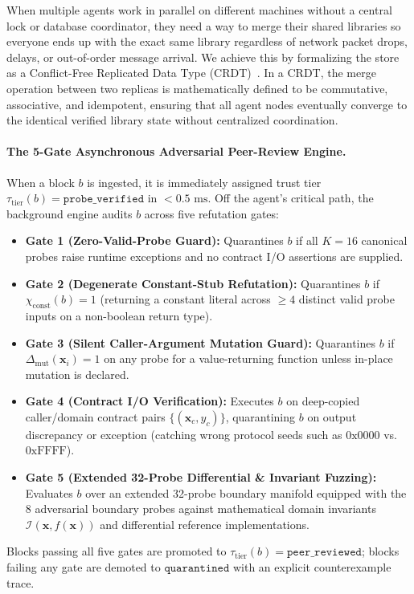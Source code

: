 \documentclass[10pt,twocolumn]{article}
\begin{document}
When multiple agents work in parallel on different machines without a central lock or database coordinator, they need a way to merge their shared libraries so everyone ends up with the exact same library regardless of network packet drops, delays, or out-of-order message arrival. We achieve this by formalizing the store as a Conflict-Free Replicated Data Type (CRDT)~\cite{shapiro2011crdt}. In a CRDT, the merge operation between two replicas is mathematically defined to be commutative, associative, and idempotent, ensuring that all agent nodes eventually converge to the identical verified library state without centralized coordination.

\paragraph{The 5-Gate Asynchronous Adversarial Peer-Review Engine.}
When a block $b$ is ingested, it is immediately assigned trust tier $\tau_{\text{tier}}(b) = \texttt{probe\_verified}$ in $<0.5\text{ ms}$. Off the agent's critical path, the background engine audits $b$ across five refutation gates:
\begin{itemize}
    \item \textbf{Gate 1 (Zero-Valid-Probe Guard):} Quarantines $b$ if all $K=16$ canonical probes raise runtime exceptions and no contract I/O assertions are supplied.
    \item \textbf{Gate 2 (Degenerate Constant-Stub Refutation):} Quarantines $b$ if $\chi_{\text{const}}(b) = 1$ (returning a constant literal across $\ge 4$ distinct valid probe inputs on a non-boolean return type).
    \item \textbf{Gate 3 (Silent Caller-Argument Mutation Guard):} Quarantines $b$ if $\Delta_{\text{mut}}(\mathbf{x}_i) = 1$ on any probe for a value-returning function unless in-place mutation is declared.
    \item \textbf{Gate 4 (Contract I/O Verification):} Executes $b$ on deep-copied caller/domain contract pairs $\{(\mathbf{x}_c, y_c)\}$, quarantining $b$ on output discrepancy or exception (catching wrong protocol seeds such as $0\text{x}0000$ vs.\ $0\text{xFFFF}$).
    \item \textbf{Gate 5 (Extended 32-Probe Differential \& Invariant Fuzzing):} Evaluates $b$ over an extended 32-probe boundary manifold equipped with the 8 adversarial boundary probes against mathematical domain invariants $\mathcal{I}(\mathbf{x}, f(\mathbf{x}))$ and differential reference implementations.
\end{itemize}
Blocks passing all five gates are promoted to $\tau_{\text{tier}}(b) = \texttt{peer\_reviewed}$; blocks failing any gate are demoted to $\texttt{quarantined}$ with an explicit counterexample trace.
\end{document}
